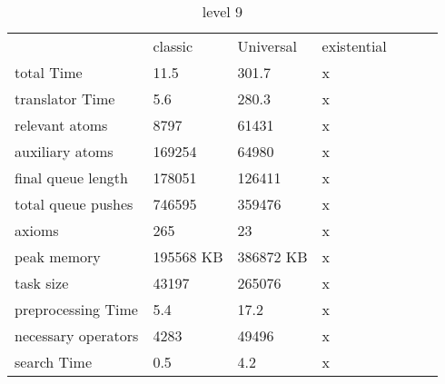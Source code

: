 						\begin{table}[h]
							\centering
							\caption{level 9}
							\label{lvl9}
							\begin{tabular}{lllllll}
								& classic  & Universal & existential\\
								total Time& 11.5 & 301.7 &x \\
								translator Time& 5.6& 280.3 & x\\
								
								
								relevant atoms & 8797& 61431 &x \\
								auxiliary atoms & 169254 & 64980 &x \\
								final queue length & 178051& 126411 &x \\
								total queue pushes & 746595& 359476 &x \\
								axioms &  265& 23 &x \\ 
								peak memory & 195568 KB& 386872 KB &x \\ 
								task size & 43197& 265076 &x \\
								
								
								preprocessing Time& 5.4 & 17.2 &x \\
								necessary operators & 4283 & 49496 &x \\
								
								
								search Time & 0.5 & 4.2 &x \\
							\end{tabular}
						\end{table}
			
			
			
